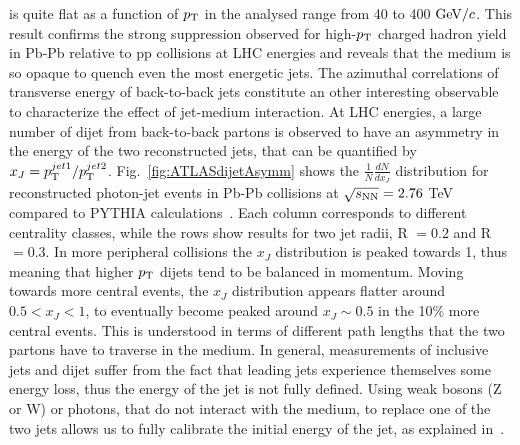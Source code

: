 is quite flat as a function of $p_{\rm T}$ in the analysed range from 40 to 400 $\mathrm{GeV}/c$. 
This result confirms the strong suppression observed for high-$p_{\rm T}$ 
charged hadron yield in Pb-Pb relative to pp collisions at LHC energies and reveals that the 
medium is so opaque to quench even the most energetic jets. The 
azimuthal correlations of transverse energy of back-to-back jets 
constitute an other interesting observable to characterize the effect 
of jet-medium interaction. At LHC energies, a large number of dijet 
from back-to-back partons is observed to have an asymmetry in the energy 
of the two reconstructed jets, that can be quantified by 
$x_J = p_{\rm T}^{jet1}/p_{\rm T}^{jet2}$. Fig.~\ref{fig:ATLASdijetAsymm} shows the $\frac{1}{N}\frac{dN}{dx_J}$ 
distribution for reconstructed photon-jet events in Pb-Pb collisions at $\sqrt{s_{\rm NN}} = 2.76$ TeV 
compared to PYTHIA calculations~\cite{ATLAS-CONF-2012-121}. 
Each column corresponds to different centrality classes, while the 
rows show results for two jet radii, R $= 0.2$ and R $=0.3$. In more 
peripheral collisions the $x_J$ distribution is peaked towards 1, thus 
meaning that higher $p_{\rm T}$ dijets tend to be balanced in momentum. 
Moving towards more central events, the $x_J$ distribution appears 
flatter around $0.5 < x_J<1$, to eventually become peaked around 
$x_J \sim 0.5$ in the 10\% more central events.
This is understood in terms of different path 
lengths that the two partons have to traverse in the medium. In general, 
measurements of inclusive jets and dijet suffer from the fact that leading jets 
experience themselves some energy loss, thus the energy of the jet is not 
fully defined. Using weak bosons (Z or W) or photons, that do not interact 
with the medium, to replace one of the two jets allows us to fully calibrate the 
initial energy of the jet, as explained in~\cite{Wang:1996yh}. 

